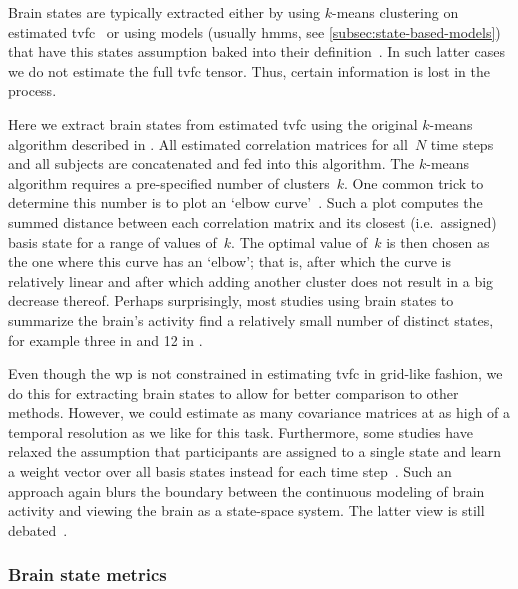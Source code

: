 Brain states are typically extracted either by using $k$-means clustering on estimated \gls{tvfc}~\parencite[see e.g.][]{Allen2014, Abrol2016, Zhi2018, Hakimdavoodi2020} or using models (usually \glspl{hmm}, see \cref{subsec:state-based-models}) that have this states assumption baked into their definition~\parencite{Lurie2020}.
In such latter cases we do not estimate the full \gls{tvfc} tensor.
Thus, certain information is lost in the process.

Here we extract brain states from estimated \gls{tvfc} using the original $k$-means algorithm described in \textcite{Lloyd1982}.
All estimated correlation matrices for all~$N$ time steps and all subjects are concatenated and fed into this algorithm.
The $k$-means algorithm requires a pre-specified number of clusters~$k$.
One common trick to determine this number is to plot an `elbow curve'~\parencite[see e.g.][chapter 5.5]{Everitt2011}.
Such a plot computes the summed distance between each correlation matrix and its closest (i.e.~assigned) basis state for a range of values of~$k$.
The optimal value of~$k$ is then chosen as the one where this curve has an `elbow'; that is, after which the curve is relatively linear and after which adding another cluster does not result in a big decrease thereof.
%
Perhaps surprisingly, most studies using brain states to summarize the brain's activity find a relatively small number of distinct states, for example three in \textcite{Choe2017, Dini2021} and 12 in \textcite{Vidaurre2017}.

Even though the \gls{wp} is not constrained in estimating \gls{tvfc} in grid-like fashion, we do this for extracting brain states to allow for better comparison to other methods.
However, we could estimate as many covariance matrices at as high of a temporal resolution as we like for this task.
%
Furthermore, some studies have relaxed the assumption that participants are assigned to a single state and learn a weight vector over all basis states instead for each time step~\parencite{Leonardi2014}.
Such an approach again blurs the boundary between the continuous modeling of brain activity and viewing the brain as a state-space system.
The latter view is still debated~\parencite[see][for an excellent discussion on the potential and shortcomings of the brain states framework]{Keilholz2017}.

\subsubsection{Brain state metrics}

